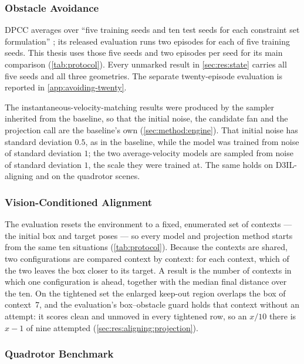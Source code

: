 \subsubsection{Obstacle Avoidance}\label{sec:setup:protocol:avoiding}

\ac{DPCC} averages over \enquote{five training seeds and ten test seeds for each constraint set
formulation} \parencite[Sec.~6.1]{romer2025diffusion}; its released evaluation runs two episodes for each of
five training seeds. This thesis uses those five seeds and two episodes per seed for its main comparison
(\autoref{tab:protocol}). Every unmarked result in \autoref{sec:res:state} carries all five seeds and all
three geometries. The separate twenty-episode evaluation is reported in
\autoref{app:avoiding-twenty}.

The instantaneous-velocity-matching results were produced by the sampler inherited from the baseline, so
that the initial noise, the candidate fan and the projection call are the baseline's own
(\autoref{sec:method:engine}). That initial noise has standard deviation $0.5$, as in the baseline,
while the model was trained from noise of standard deviation $1$; the two average-velocity models are
sampled from noise of standard deviation $1$, the scale they were trained at. The same holds on
D3IL-aligning and on the quadrotor scenes.

\subsubsection{Vision-Conditioned Alignment}\label{sec:setup:protocol:aligning}

The evaluation resets the environment to a fixed, enumerated set of contexts --- the initial box and target
poses --- so every model and projection method starts from the same ten situations
(\autoref{tab:protocol}). Because the contexts are shared, two configurations are compared context by
context: for each context, which of the two leaves the box closer to its target. A result is the number of
contexts in which one configuration is ahead, together with the median final distance over the ten.
On the tightened set the enlarged keep-out region overlaps the box of context~7, and the evaluation's
box--obstacle guard holds that context without an attempt: it scores clean and unmoved in every tightened row,
so an $x/10$ there is $x-1$ of nine attempted (\autoref{sec:res:aligning:projection}).

\subsubsection{Quadrotor Benchmark}\label{sec:setup:protocol:uav}

